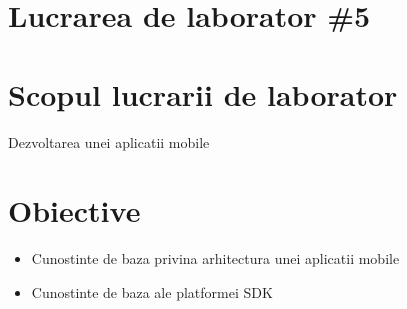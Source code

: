 \section*{Lucrarea de laborator \#5}

\section{Scopul lucrarii de laborator}
Dezvoltarea unei aplicatii mobile\\
\section{Obiective}
\begin{itemize}
\item Cunostinte de baza privina arhitectura unei aplicatii mobile
\item Cunostinte de baza ale platformei SDK
\end{itemize}
\clearpage
